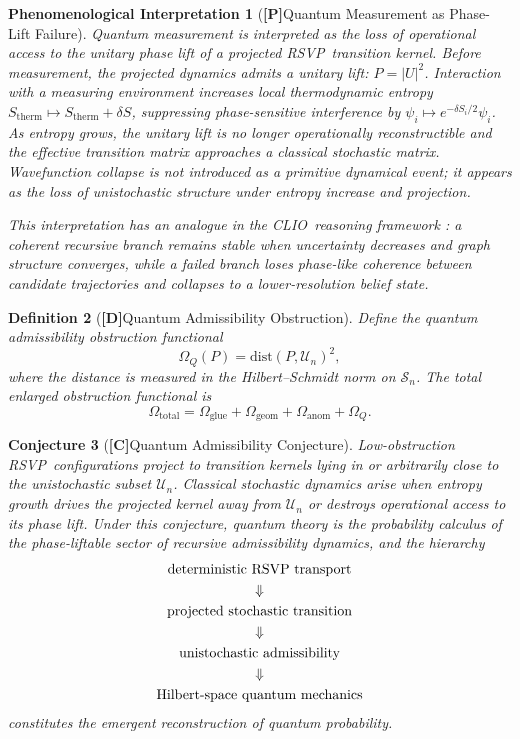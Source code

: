 \documentclass[12pt,a4paper]{article}
\newcommand{\claimD}{\textbf{[D]}\;}
\newcommand{\claimC}{\textbf{[C]}\;}
\newcommand{\claimP}{\textbf{[P]}\;}
\newtheorem{defn}{Definition}[section]
\newtheorem{appconj}[defn]{Conjecture}
\newtheorem{appphen}[defn]{Phenomenological Interpretation}
\newcommand{\RSVP}{\textrm{RSVP}}
\newcommand{\CLIO}{\textrm{CLIO}}
\begin{document}
\begin{appphen}[\claimP Quantum Measurement as Phase-Lift Failure]
Quantum measurement is interpreted as the loss of operational access to the
unitary phase lift of a projected \RSVP\ transition kernel. Before measurement,
the projected dynamics admits a unitary lift: $P=|U|^2$. Interaction with a
measuring environment increases local thermodynamic entropy $S_\mathrm{therm}
\mapsto S_\mathrm{therm}+\delta S$, suppressing phase-sensitive interference
by $\psi_i\mapsto e^{-\delta S_i/2}\psi_i$. As entropy grows, the unitary
lift is no longer operationally reconstructible and the effective transition
matrix approaches a classical stochastic matrix. Wavefunction collapse is not
introduced as a primitive dynamical event; it appears as the loss of
unistochastic structure under entropy increase and projection.

This interpretation has an analogue in the \CLIO\ reasoning framework
\cite{Cheng2025}: a coherent recursive branch remains stable when uncertainty
decreases and graph structure converges, while a failed branch loses
phase-like coherence between candidate trajectories and collapses to a
lower-resolution belief state.
\end{appphen}

\begin{defn}[\claimD Quantum Admissibility Obstruction]
Define the quantum admissibility obstruction functional
\[
\Omega_Q(P) = \mathrm{dist}(P,\mathcal{U}_n)^2,
\]
where the distance is measured in the Hilbert--Schmidt norm on $\mathcal{S}_n$.
The total enlarged obstruction functional is
\[
\Omega_\mathrm{total}
= \Omega_\mathrm{glue}
+ \Omega_\mathrm{geom}
+ \Omega_\mathrm{anom}
+ \Omega_Q.
\]
\end{defn}

\begin{appconj}[\claimC Quantum Admissibility Conjecture]
Low-obstruction \RSVP\ configurations project to transition kernels lying in
or arbitrarily close to the unistochastic subset $\mathcal{U}_n$. Classical
stochastic dynamics arise when entropy growth drives the projected kernel away
from $\mathcal{U}_n$ or destroys operational access to its phase lift. Under
this conjecture, quantum theory is the probability calculus of the
phase-liftable sector of recursive admissibility dynamics, and the hierarchy
\[
\begin{gathered}
\text{deterministic \RSVP\ transport} \\
\Downarrow \\
\text{projected stochastic transition} \\
\Downarrow \\
\text{unistochastic admissibility} \\
\Downarrow \\
\text{Hilbert-space quantum mechanics}
\end{gathered}
\]
constitutes the emergent reconstruction of quantum probability.
\end{appconj}
\end{document}

